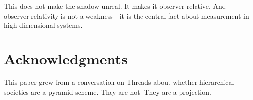 \documentclass[12pt,a4paper]{article}
\begin{document}
This does not make the shadow unreal.
It makes it observer-relative.
And observer-relativity is not a weakness---it is the central fact about measurement in high-dimensional systems.


\section*{Acknowledgments}

This paper grew from a conversation on Threads about whether hierarchical societies are a pyramid scheme.
They are not.
They are a projection.




\end{document}

